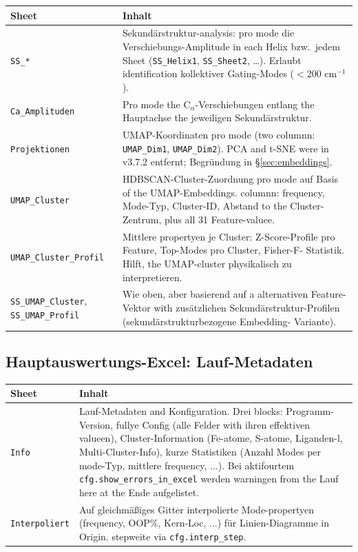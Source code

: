 \documentclass[11pt,a4paper,twoside]{article}
\theoremstyle{remark}
\begin{document}
\begin{longtable}{p{} p{}}
\toprule
\textbf{Sheet} & \textbf{Inhalt} \\
\midrule
\endhead

\texttt{SS\_*} & Sekund\"arstruktur-analysis: pro mode die
  Verschiebungs-Amplitude in each Helix bzw.\ jedem Sheet
  (\texttt{SS\_Helix1}, \texttt{SS\_Sheet2}, \ldots). Erlaubt
  identification kollektiver Gating-Modes ($<$200 cm$^{-1}$). \\

\texttt{Ca\_Amplituden} & Pro mode the C$_\alpha$-Verschiebungen
  entlang the Hauptachse the jeweiligen Sekund\"arstruktur. \\

\texttt{Projektionen} & UMAP-Koordinaten pro mode (two columnn:
  \texttt{UMAP\_Dim1}, \texttt{UMAP\_Dim2}). PCA and t-SNE were in
  v3.7.2 entfernt; Begr\"undung in \S\ref{sec:embeddings}. \\

\texttt{UMAP\_Cluster} & HDBSCAN-Cluster-Zuordnung pro mode auf
  Basis of the UMAP-Embeddings. columnn: frequency, Mode-Typ,
  Cluster-ID, Abstand to the Cluster-Zentrum, plus all 31
  Feature-valuee. \\

\texttt{UMAP\_Cluster\_Profil} & Mittlere propertyen je Cluster:
  Z-Score-Profile pro Feature, Top-Modes pro Cluster, Fisher-F-
  Statistik. Hilft, the UMAP-cluster physikalisch zu interpretieren. \\

\texttt{SS\_UMAP\_Cluster}, \texttt{SS\_UMAP\_Profil} & Wie oben, aber
  basierend auf a alternativen Feature-Vektor with zus\"atzlichen
  Sekund\"arstruktur-Profilen (sekund\"arstrukturbezogene Embedding-
  Variante). \\
\bottomrule
\end{longtable}

\subsection{Hauptauswertungs-Excel: Lauf-Metadaten}

\begin{longtable}{p{} p{}}
\toprule
\textbf{Sheet} & \textbf{Inhalt} \\
\midrule
\endhead

\texttt{Info} & Lauf-Metadaten and Konfiguration. Drei blocks:
  Programm-Version, fullye Config (alle Felder with ihren
  effektiven valueen), Cluster-Information (Fe-atome, S-atome,
  Liganden-l, Multi-Cluster-Info), kurze Statistiken (Anzahl
  Modes per mode-Typ, mittlere frequency, ...).
  Bei aktifourtem \texttt{cfg.show\_errors\_in\_excel} werden
  warningen from the Lauf here at the Ende aufgelistet. \\

\texttt{Interpoliert} & Auf gleichm\"a\ss iges Gitter interpolierte
  Mode-propertyen (frequency, OOP\%, Kern-Loc, ...) f\"ur
  Linien-Diagramme in Origin. stepweite via
  \texttt{cfg.interp\_step}. \\
\bottomrule
\end{longtable}
\end{document}
